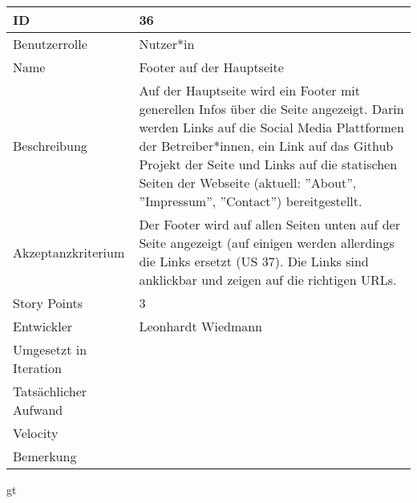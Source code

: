 \begin{tabularx}{\textwidth}{|p{}|X|}
	\hline
	ID & 36\\
	\hline
	Benutzerrolle & Nutzer*in\\
	\hline
	Name & Footer auf der Hauptseite\\
	\hline
	Beschreibung & Auf der Hauptseite wird ein Footer mit generellen Infos über die Seite angezeigt. Darin werden Links auf die Social Media Plattformen der Betreiber*innen, ein Link auf das Github Projekt der Seite und Links auf die statischen Seiten der Webseite (aktuell: ''About'', ''Impressum'', ''Contact'') bereitgestellt.\\
	\hline
	Akzeptanzkriterium & Der Footer wird auf allen Seiten unten auf der Seite angezeigt (auf einigen werden allerdings die Links ersetzt (US 37). Die Links sind anklickbar und zeigen auf die richtigen URLs.\\
	\hline
	Story Points & 3\\
	\hline
	Entwickler & Leonhardt Wiedmann\\
	\hline
	Umgesetzt in Iteration & \\
	\hline
	Tatsächlicher Aufwand & \\
	\hline
	Velocity & \\
	\hline
	Bemerkung & \\
	\hline
\end{tabularx}
\vspace{20pt}gt
